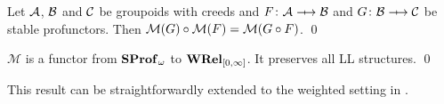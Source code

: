 \begin{corollary}
    Let \( \mathcal{A} \), \( \mathcal{B} \) and \( \mathcal{C} \) be groupoids with creeds and \( F \colon \creed \profarrow \creedb \) and \( G \colon \creedb \profarrow \creedc \) be stable profunctors.
    Then \( \mathcal{M}({G}) \circ \mathcal{M}({F}) = \mathcal{M}({G \circ F}) \).
    \qed
\end{corollary}

\begin{theorem}
    \( \mathcal{M} \) is a functor from \( \mathbf{SProf}_{\omega} \) to \( \mathbf{WRel}_{[0,\infty]} \).
    It preserves all LL structures.
    \qed
\end{theorem}

This result can be straightforwardly extended to the weighted setting in \cite{Tsukada2018}.



